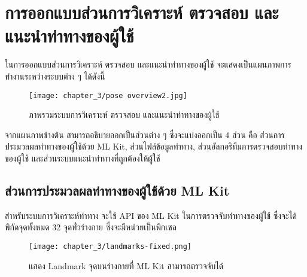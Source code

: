\section{การออกแบบส่วนการวิเคราะห์ ตรวจสอบ และแนะนำท่าทางของผู้ใช้}
ในการออกแบบส่วนการวิเคราะห์ ตรวจสอบ และแนะนำท่าทางของผู้ใช้ จะแสดงเป็นแผนภาพการทำงานระหว่างระบบต่าง ๆ ได้ดังนี้
\begin{figure}
    \texttt{[image: chapter\_3/pose overview2.jpg]}
    \caption{ภาพรวมระบบการวิเคราะห์ ตรวจสอบ และแนะนำท่าทางของผู้ใช้}
\end{figure}
จากแผนภาพข้างต้น สามารถอธิบายออกเป็นส่วนต่าง ๆ ซึ่งจะแบ่งออกเป็น 4 ส่วน คือ ส่วนการประมวลผลท่าทางของผู้ใช้ด้วย ML Kit, ส่วนไฟล์ข้อมูลท่าทาง, ส่วนอัลกอริทึมการตรวจสอบท่าทางของผู้ใช้ และส่วนระบบแนะนำท่าทางที่ถูกต้องให้ผู้ใช้

\subsection{ส่วนการประมวลผลท่าทางของผู้ใช้ด้วย ML Kit}
สำหรับระบบการวิเคราะห์ท่าทาง จะใช้ API ของ ML Kit ในการตรวจจับท่าทางของผู้ใช้ ซึ่งจะได้พิกัดจุดทั้งหมด 32 จุดทั่วร่างกาย ซึ่งจะมีหน่วยเป็นพิกเซล
\begin{figure}
    \texttt{[image: chapter\_3/landmarks-fixed.png]}
    \caption{แสดง Landmark จุดบนร่างกายที่ ML Kit สามารถตรวจจับได้}
\end{figure}

